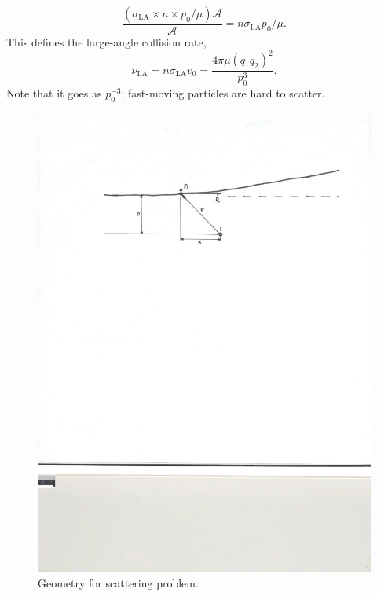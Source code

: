 \[ \frac{(\sigma_{\mathrm{LA}}\times n\times p_{0}/\mu) \mathcal{A}}{\mathcal{A}}  = n\sigma_{\mathrm{LA}} p_{0}/\mu. \]
This defines the large-angle collision rate,
\begin{equation}\label{e.large-angle-collision-rate}
\nu_{\mathrm{LA}} = n\sigma_{\mathrm{LA}} v_{0} = \frac{4\pi \mu (q_{1}q_{2})^{2}}{p_{0}^{3}}.
\end{equation}
Note that it goes as $p_{0}^{-3}$; fast-moving particles are hard to scatter.

\begin{figure}[htbp]
\includegraphics[width=\textwidth]{scattering}
\caption{Geometry for scattering problem.}
\label{f.scattering}
\end{figure}

